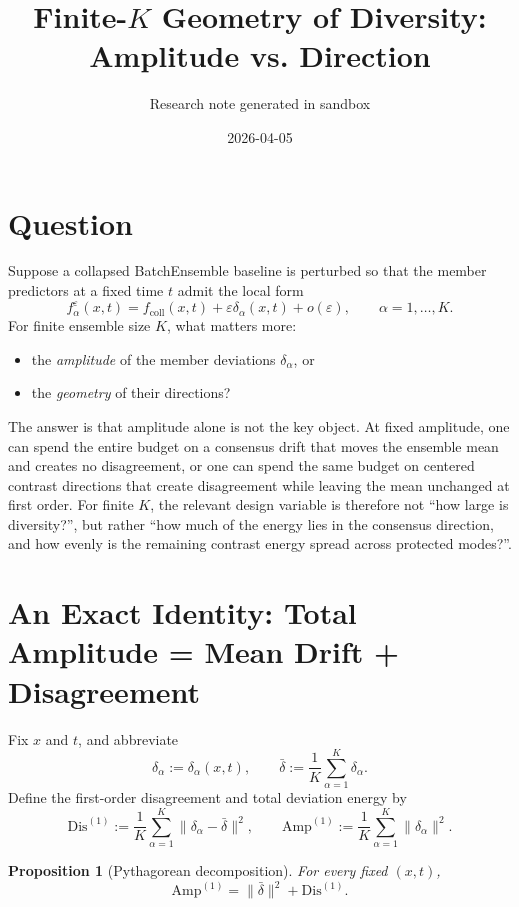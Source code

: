 \documentclass[11pt]{article}
\title{Finite-\texorpdfstring{$K$}{K} Geometry of Diversity: Amplitude vs. Direction}
\author{Research note generated in sandbox}
\date{2026-04-05}
\newtheorem{proposition}[theorem]{Proposition}
\theoremstyle{remark}
\begin{document}
\maketitle

\section{Question}

Suppose a collapsed BatchEnsemble baseline is perturbed so that the member predictors at a fixed time $t$ admit the local form
\begin{equation}
f_\alpha^\varepsilon(x,t)
=
f_{\mathrm{coll}}(x,t)
+
\varepsilon \delta_\alpha(x,t)
+ o(\varepsilon),
\qquad
\alpha=1,\dots,K.
\label{eq:local-members}
\end{equation}
For finite ensemble size $K$, what matters more:
\begin{itemize}
\item the \emph{amplitude} of the member deviations $\delta_\alpha$, or
\item the \emph{geometry} of their directions?
\end{itemize}

The answer is that amplitude alone is not the key object. At fixed amplitude, one can spend the entire budget on a consensus drift that moves the ensemble mean and creates no disagreement, or one can spend the same budget on centered contrast directions that create disagreement while leaving the mean unchanged at first order. For finite $K$, the relevant design variable is therefore not ``how large is diversity?'', but rather ``how much of the energy lies in the consensus direction, and how evenly is the remaining contrast energy spread across protected modes?''.

\section{An Exact Identity: Total Amplitude = Mean Drift + Disagreement}

Fix $x$ and $t$, and abbreviate
\[
\delta_\alpha := \delta_\alpha(x,t),
\qquad
\bar\delta := \frac1K \sum_{\alpha=1}^K \delta_\alpha.
\]
Define the first-order disagreement and total deviation energy by
\[
\mathrm{Dis}^{(1)} := \frac1K\sum_{\alpha=1}^K \|\delta_\alpha-\bar\delta\|^2,
\qquad
\mathrm{Amp}^{(1)} := \frac1K\sum_{\alpha=1}^K \|\delta_\alpha\|^2.
\]

\begin{proposition}[Pythagorean decomposition]
\label{prop:pythagorean}
For every fixed $(x,t)$,
\begin{equation}
\mathrm{Amp}^{(1)}
=
\|\bar\delta\|^2 + \mathrm{Dis}^{(1)}.
\label{eq:pythagorean}
\end{equation}
\end{proposition}
\end{document}
